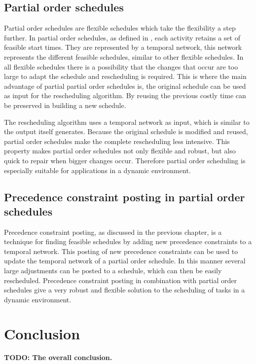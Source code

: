 \documentclass{article}
\newcommand{\TODO}[1]{{\color{red}\textbf{TODO: #1}}}
\begin{document}
\subsection{Partial order schedules}
Partial order schedules are flexible schedules which take the flexibility a step further.
In partial order schedules, as defined in \citet{policella07}, each activity retains a set of feasible start times.
They are represented by a temporal network, this network represents the different feasible schedules, similar to other flexible schedules.
In all flexible schedules there is a possibility that the changes that occur are too large to adapt the schedule and rescheduling is required.
This is where the main advantage of partial partial order schedules is, the original schedule can be used as input for the rescheduling algorithm.
By reusing the previous costly time can be preserved in building a new schedule.

The rescheduling algorithm uses a temporal network as input, which is similar to the output itself generates.
Because the original schedule is modified and reused, partial order schedules make the complete rescheduling less intensive.
This property makes partial order schedules not only flexible and robust, but also quick to repair when bigger changes occur.
Therefore partial order scheduling is especially suitable for applications in a dynamic environment.

\subsection{Precedence constraint posting in partial order schedules}
Precedence constraint posting, as discussed in the previous chapter, is a technique for finding feasible schedules by adding new precedence constraints to a temporal network.
This posting of new precedence constraints can be used to update the temporal network of a partial order schedule.
In this manner several large adjustments can be posted to a schedule, which can then be easily rescheduled.
Precedence constraint posting in combination with partial order schedules give a very robust and flexible solution to the scheduling of tasks in a dynamic environment.

\newpage

\section{Conclusion}
\TODO{The overall conclusion.}

\newpage


\end{document}
